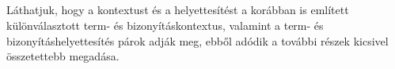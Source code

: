 \begin{code}
\AgdaSymbol{)}\<%
\\
%
\>[2]\AgdaSymbol{;}\AgdaSpace{}%
\AgdaSpace{}%
\AgdaSymbol{=}\AgdaSpace{}%
\<%
\\
%
\>[2]\AgdaSymbol{;}\AgdaSpace{}%
\AgdaSpace{}%
\AgdaSymbol{=}%
\>[3174I]\AgdaSpace{}%
\AgdaSymbol{\{}\AgdaBound{(}\AgdaSpace{}%
\AgdaOperator{\AgdaInductiveConstructor{,}}\AgdaSpace{}%
\AgdaBound{)}\AgdaSymbol{\}\{}\AgdaSymbol{\}\{}\AgdaSymbol{\}}\AgdaSpace{}%
\AgdaSpace{}%
\<%
\\
\>[3174I][@{}l@{\AgdaIndent{0}}]%
\>[12]%
\>[3180I]\AgdaSpace{}%
\AgdaSymbol{\{}\AgdaSymbol{\}\{}\AgdaSymbol{\}\{}\AgdaSymbol{\}\{}\AgdaSymbol{\}}\<%
\\
\>[.][@{}l@{}]\<[3180I]%
\>[14]\AgdaSymbol{(}\<%
\\
\>[14][@{}l@{\AgdaIndent{0}}]%
\>[16]\AgdaSpace{}%
\AgdaSpace{}%
\AgdaSpace{}%
\AgdaSpace{}%
\AgdaSymbol{(}\AgdaSpace{}%
\AgdaSymbol{)}\AgdaSpace{}%
\AgdaSymbol{((}\AgdaSpace{}%
\AgdaOperator{\AgdaFunction{[}}\AgdaSpace{}%
\AgdaSpace{}%
\AgdaOperator{\AgdaFunction{]Conp}}\AgdaSymbol{)}\AgdaSpace{}%
\AgdaSpace{}%
\AgdaSymbol{)}\AgdaSpace{}%
\AgdaSymbol{(}\AgdaSpace{}%
\AgdaOperator{\AgdaFunction{[}}\AgdaSpace{}%
\AgdaSpace{}%
\AgdaOperator{\AgdaFunction{]ᶠ}}\AgdaSymbol{))}\<%
\\
%
\>[16]\<%
\\
%
\>[16]\AgdaSymbol{)}\<%
\\
%
\>[14]\<%
\\
%
\>[2]\AgdaSymbol{\}}\<%
\end{code}

Láthatjuk, hogy a kontextust és a helyettesítést a korábban is említett különválasztott term- és bizonyításkontextus, valamint a term- és bizonyításhelyettesítés párok adják meg, ebből adódik a további részek kicsivel összetettebb megadása.